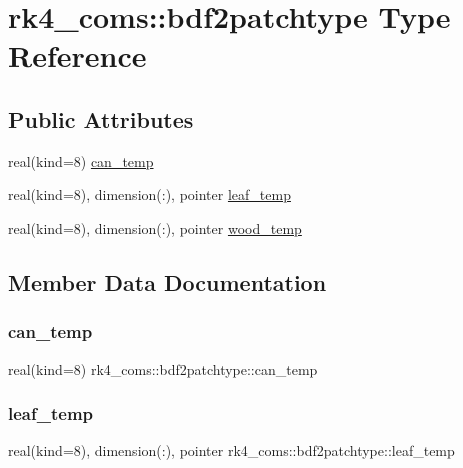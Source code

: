 \hypertarget{structrk4__coms_1_1bdf2patchtype}{}\section{rk4\+\_\+coms\+:\+:bdf2patchtype Type Reference}
\label{structrk4__coms_1_1bdf2patchtype}
\subsection*{Public Attributes}
\begin{DoxyCompactItemize}
\item 
real(kind=8) \hyperlink{structrk4__coms_1_1bdf2patchtype_aec0aed9409122068c64242b3110a943d}{can\+\_\+temp}
\item 
real(kind=8), dimension(\+:), pointer \hyperlink{structrk4__coms_1_1bdf2patchtype_a3bfd89d8aeb7e32b951eb9a8cb16f61e}{leaf\+\_\+temp}
\item 
real(kind=8), dimension(\+:), pointer \hyperlink{structrk4__coms_1_1bdf2patchtype_a760e813763073c0ebbcc9768d2d85b92}{wood\+\_\+temp}
\end{DoxyCompactItemize}


\subsection{Member Data Documentation}
\mbox{\label{structrk4__coms_1_1bdf2patchtype_aec0aed9409122068c64242b3110a943d}} 
\subsubsection{\texorpdfstring{can\+\_\+temp}{can\_temp}}
{\footnotesize\ttfamily real(kind=8) rk4\+\_\+coms\+::bdf2patchtype\+::can\+\_\+temp}

\mbox{\label{structrk4__coms_1_1bdf2patchtype_a3bfd89d8aeb7e32b951eb9a8cb16f61e}} 
\subsubsection{\texorpdfstring{leaf\+\_\+temp}{leaf\_temp}}
{\footnotesize\ttfamily real(kind=8), dimension(\+:), pointer rk4\+\_\+coms\+::bdf2patchtype\+::leaf\+\_\+temp}

